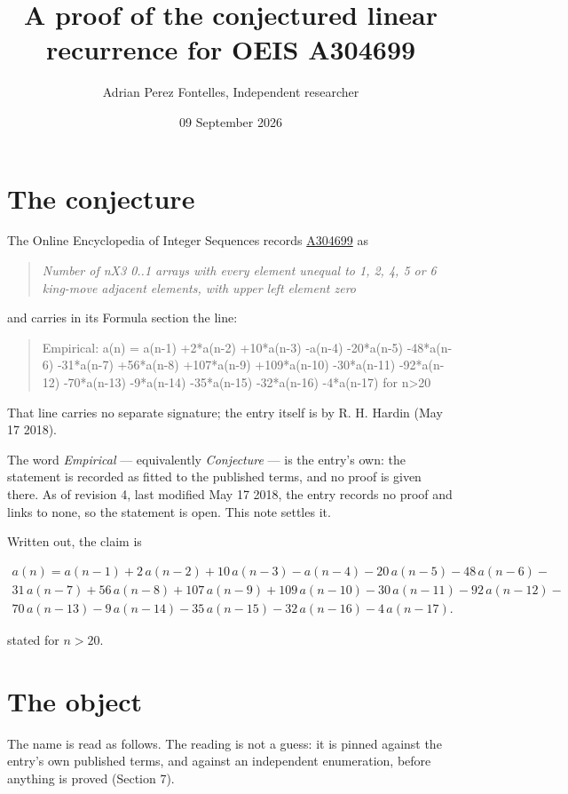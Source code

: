 \documentclass[11pt]{article}
\title{A proof of the conjectured linear recurrence for OEIS A304699}
\author{Adrian Perez Fontelles, Independent researcher}
\date{09 September 2026}
\theoremstyle{definition}
\begin{document}
\maketitle
\section{The conjecture}

The Online Encyclopedia of Integer Sequences records \href{https://oeis.org/A304699}{A304699} as

\begin{quote}\itshape Number of nX3 0..1 arrays with every element unequal to 1, 2, 4, 5 or 6 king-move adjacent elements, with upper left element zero\end{quote}

and carries in its Formula section the line:

\begin{quote}\ttfamily Empirical: a(n) = a(n-1) +2*a(n-2) +10*a(n-3) -a(n-4) -20*a(n-5) -48*a(n-6) -31*a(n-7) +56*a(n-8) +107*a(n-9) +109*a(n-10) -30*a(n-11) -92*a(n-12) -70*a(n-13) -9*a(n-14) -35*a(n-15) -32*a(n-16) -4*a(n-17) for n>20\end{quote}

That line carries no separate signature; the entry itself is by R. H. Hardin (May 17 2018).

The word {\itshape Empirical} --- equivalently {\itshape Conjecture} --- is the entry's own: the statement is recorded as fitted to the published terms, and no proof is given there. As of revision 4, last modified May 17 2018, the entry records no proof and links to none, so the statement is open. This note settles it.

Written out, the claim is

\begin{multline*} a(n) = a(n-1) + 2\,a(n-2) + 10\,a(n-3) - a(n-4) - 20\,a(n-5) - 48\,a(n-6) - \\ 31\,a(n-7) + 56\,a(n-8) + 107\,a(n-9) + 109\,a(n-10) - 30\,a(n-11) - 92\,a(n-12) - \\ 70\,a(n-13) - 9\,a(n-14) - 35\,a(n-15) - 32\,a(n-16) - 4\,a(n-17). \end{multline*}

stated for $n > 20$.

\section{The object}

The name is read as follows. The reading is not a guess: it is pinned against the entry's own published terms, and against an independent enumeration, before anything is proved (Section 7).
\end{document}
